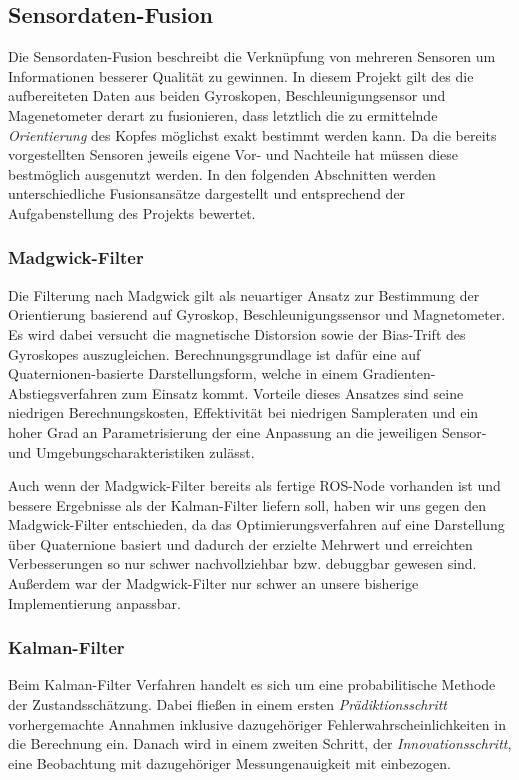 
\subsection{Sensordaten-Fusion}
\label{headtracking_fusion_subsec}
Die Sensordaten-Fusion beschreibt die Verknüpfung von mehreren Sensoren um Informationen besserer Qualität zu gewinnen. In diesem Projekt gilt des die aufbereiteten Daten aus beiden Gyroskopen, Beschleunigungsensor und Magenetometer derart zu fusionieren, dass letztlich die zu ermittelnde \emph{Orientierung} des Kopfes möglichst exakt bestimmt werden kann. Da die bereits vorgestellten Sensoren jeweils eigene Vor- und Nachteile hat müssen diese bestmöglich ausgenutzt werden. In den folgenden Abschnitten werden unterschiedliche Fusionsansätze dargestellt und entsprechend der Aufgabenstellung des Projekts bewertet. 

\subsubsection{Madgwick-Filter}
Die Filterung nach Madgwick \cite{madgwick2010efficient} gilt als neuartiger Ansatz zur Bestimmung der Orientierung basierend auf Gyroskop, Beschleunigungssensor und Magnetometer.
Es wird dabei versucht die magnetische Distorsion sowie der Bias-Trift des Gyroskopes auszugleichen.
Berechnungsgrundlage ist dafür eine auf Quaternionen-basierte Darstellungsform, welche in einem Gradienten-Abstiegsverfahren zum Einsatz kommt.
Vorteile dieses Ansatzes sind seine niedrigen Berechnungskosten, Effektivität bei niedrigen Sampleraten und ein hoher Grad an Parametrisierung der eine Anpassung an die jeweiligen Sensor- und Umgebungscharakteristiken zulässt.

Auch wenn der Madgwick-Filter bereits als fertige ROS-Node vorhanden ist und bessere Ergebnisse als der Kalman-Filter liefern soll, haben wir uns gegen den Madgwick-Filter entschieden, da das Optimierungsverfahren auf eine Darstellung über Quaternione basiert und dadurch der erzielte Mehrwert und erreichten Verbesserungen so nur schwer nachvollziehbar bzw. debuggbar gewesen sind. Außerdem war der Madgwick-Filter nur schwer an unsere bisherige Implementierung anpassbar.

\subsubsection{Kalman-Filter}
Beim Kalman-Filter Verfahren  handelt es sich um eine probabilitische Methode der Zustandsschätzung.
Dabei fließen in einem ersten \emph{Prädiktionsschritt} vorhergemachte Annahmen inklusive dazugehöriger Fehlerwahrscheinlichkeiten in die Berechnung ein.
Danach wird in einem zweiten Schritt, der \emph{Innovationsschritt}, eine Beobachtung mit dazugehöriger Messungenauigkeit mit einbezogen.

